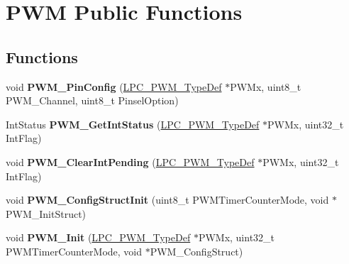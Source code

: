 \hypertarget{group___p_w_m___public___functions}{\section{\-P\-W\-M \-Public \-Functions}
\label{group___p_w_m___public___functions}
}
\subsection*{\-Functions}
\begin{DoxyCompactItemize}
\item 
\hypertarget{group___p_w_m___public___functions_ga0e421f63970ca1b6230a4105bfaa93ec}{void {\bfseries \-P\-W\-M\-\_\-\-Pin\-Config} (\hyperlink{struct_l_p_c___p_w_m___type_def}{\-L\-P\-C\-\_\-\-P\-W\-M\-\_\-\-Type\-Def} $\ast$\-P\-W\-Mx, uint8\-\_\-t \-P\-W\-M\-\_\-\-Channel, uint8\-\_\-t \-Pinsel\-Option)}\label{group___p_w_m___public___functions_ga0e421f63970ca1b6230a4105bfaa93ec}

\item 
\hypertarget{group___p_w_m___public___functions_ga3363ad216eeb6ac34d3a7169ee6baa2a}{\-Int\-Status {\bfseries \-P\-W\-M\-\_\-\-Get\-Int\-Status} (\hyperlink{struct_l_p_c___p_w_m___type_def}{\-L\-P\-C\-\_\-\-P\-W\-M\-\_\-\-Type\-Def} $\ast$\-P\-W\-Mx, uint32\-\_\-t \-Int\-Flag)}\label{group___p_w_m___public___functions_ga3363ad216eeb6ac34d3a7169ee6baa2a}

\item 
\hypertarget{group___p_w_m___public___functions_ga64d03316e38d04bf7fc427722c8483fc}{void {\bfseries \-P\-W\-M\-\_\-\-Clear\-Int\-Pending} (\hyperlink{struct_l_p_c___p_w_m___type_def}{\-L\-P\-C\-\_\-\-P\-W\-M\-\_\-\-Type\-Def} $\ast$\-P\-W\-Mx, uint32\-\_\-t \-Int\-Flag)}\label{group___p_w_m___public___functions_ga64d03316e38d04bf7fc427722c8483fc}

\item 
\hypertarget{group___p_w_m___public___functions_ga9735269702413524ea756d1d8f39e8db}{void {\bfseries \-P\-W\-M\-\_\-\-Config\-Struct\-Init} (uint8\-\_\-t \-P\-W\-M\-Timer\-Counter\-Mode, void $\ast$\-P\-W\-M\-\_\-\-Init\-Struct)}\label{group___p_w_m___public___functions_ga9735269702413524ea756d1d8f39e8db}

\item 
\hypertarget{group___p_w_m___public___functions_ga6012759589458b1ec053fe75d4e3b156}{void {\bfseries \-P\-W\-M\-\_\-\-Init} (\hyperlink{struct_l_p_c___p_w_m___type_def}{\-L\-P\-C\-\_\-\-P\-W\-M\-\_\-\-Type\-Def} $\ast$\-P\-W\-Mx, uint32\-\_\-t \-P\-W\-M\-Timer\-Counter\-Mode, void $\ast$\-P\-W\-M\-\_\-\-Config\-Struct)}\label{group___p_w_m___public___functions_ga6012759589458b1ec053fe75d4e3b156}


\end{DoxyCompactItemize}
